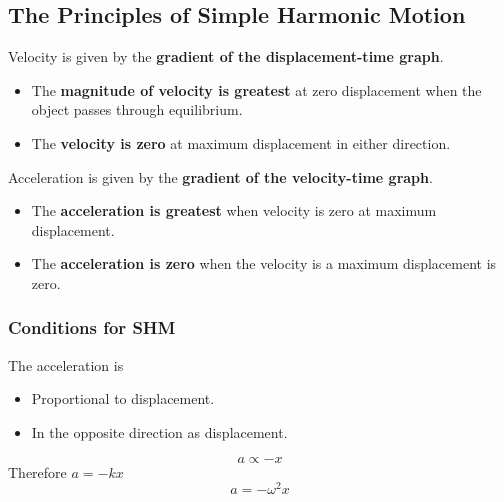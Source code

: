 \subsection{The Principles of Simple Harmonic Motion}

Velocity is given by the \textbf{gradient of the displacement-time graph}.
\begin{itemize}
    \item The \textbf{magnitude of velocity is greatest} at zero displacement when the object passes through equilibrium.
    \item The \textbf{velocity is zero} at maximum displacement in either direction.
\end{itemize}

Acceleration is given by the \textbf{gradient of the velocity-time graph}.
\begin{itemize}
    \item The \textbf{acceleration is greatest} when velocity is zero at maximum displacement.
    \item The \textbf{acceleration is zero} when the velocity is a maximum displacement is zero.
\end{itemize}

\subsubsection*{Conditions for SHM}

The acceleration is
\begin{itemize}
    \item Proportional to displacement.
    \item In the opposite direction as displacement.
\end{itemize}

$$a\propto-x$$
Therefore $a=-kx$
$$a=-\omega^2x$$
